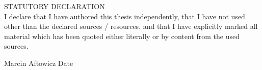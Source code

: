 {}

{\noindent}STATUTORY DECLARATION\\

I declare that I have authored this thesis independently, that I have not used other than the declared 
sources  /  resources,  and  that  I  have  explicitly  marked  all  material  which  has  been  quoted  either  
literally or by content from the used sources. \\
\par\vspace{15mm}\par

Marcin Aftowicz \hfill Date \hspace{2cm}

